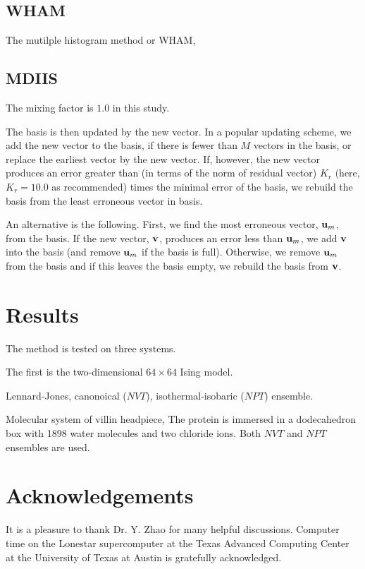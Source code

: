 \documentclass[preprint]{revtex4-1}
\begin{document}
\subsection{WHAM}



The mutilple histogram method or WHAM,



\subsection{MDIIS}


The mixing factor is $1.0$ in this study.


The basis is then updated by the new vector.
%
In a popular updating scheme\cite{kovalenko1999},
we add the new vector to the basis,
if there is fewer than $M$ vectors in the basis,
%
or replace the earliest vector by the new vector.
%
If, however, the new vector
produces an error greater than
(in terms of the norm of residual vector)
$K_r$ (here, $K_r = 10.0$ as recommended)
times the minimal error of the basis,
%
we rebuild the basis
from the least erroneous vector in basis.



An alternative is the following.
%
First, we find the most erroneous vector,
$\mathbf{u}_m$, from the basis.
%
If the new vector, $\mathbf{v}$,
produces an error less than $\mathbf{u}_m$,
we add $\mathbf{v}$ into the basis
(and remove $\mathbf{u}_m$ if the basis is full).
%
Otherwise,
we remove $\mathbf{u}_m$ from the basis
and if this leaves the basis empty,
we rebuild the basis from $\mathbf{v}$.
%



\section{Results}



The method is tested on three systems.


The first is the two-dimensional $64\times64$ Ising model.


Lennard-Jones, canonoical ($NVT$), isothermal-isobaric ($NPT$) ensemble.



Molecular system of villin headpiece,
The protein is immersed in
a dodecahedron box with 1898 water molecules and two chloride ions.
%
Both $NVT$ and $NPT$ ensembles are used.





\section{Acknowledgements}



It is a pleasure to thank Dr. Y. Zhao
for many helpful discussions.
%
Computer time on the Lonestar supercomputer
at the Texas Advanced Computing Center
at the University of Texas at Austin
is gratefully acknowledged.




\end{document}
